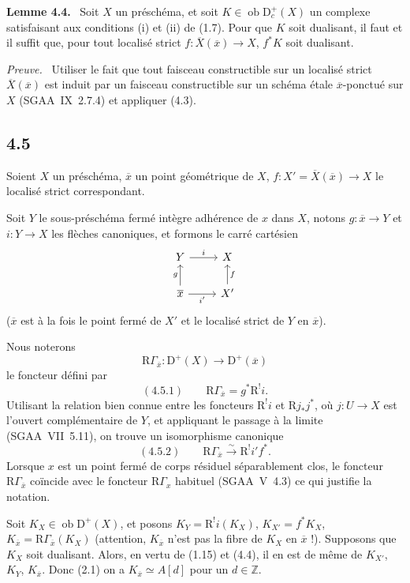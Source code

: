 \documentclass[11pt]{article}
\newenvironment{statement}[1]{\par\medskip\noindent\textbf{#1.}\ }{\par\medskip}
\newenvironment{prooftext}[1][Proof]{\par\noindent\emph{#1.}\ }{\par\medskip}
\newcommand{\R}{\mathrm{R}}\newcommand{\RHomCore}{\mathrm{RHom}}
\newcommand{\D}{\mathrm{D}}
\newcommand{\Z}{\mathbb{Z}}
\newcommand{\ob}{\operatorname{ob}}
\newcommand{\ol}[1]{\overline{#1}}
\providecommand{\ob}{\operatorname{ob}}
\providecommand{\R}{\mathrm R}
\providecommand{\Z}{\mathbb Z}
\begin{document}
\begin{statement}{Lemme 4.4}
Soit $X$ un préschéma, et soit $K\in\ob\D_c^+(X)$ un complexe satisfaisant aux conditions (i) et (ii) de (1.7). Pour que $K$ soit dualisant, il faut et il suffit que, pour tout localisé strict $f:\ol{X}(\ol{x})\to X$, $f^*K$ soit dualisant.
\end{statement}

\begin{prooftext}[Preuve]
Utiliser le fait que tout faisceau constructible sur un localisé strict $\ol{X}(\ol{x})$ est induit par un faisceau constructible sur un schéma étale $\ol{x}$-ponctué sur $X$ (SGAA~IX~2.7.4) et appliquer (4.3).
\end{prooftext}

\subsection*{4.5}
Soient $X$ un préschéma, $\ol{x}$ un point géométrique de $X$, $f:X'=\ol{X}(\ol{x})\to X$ le localisé strict correspondant.

Soit $Y$ le sous-préschéma fermé intègre adhérence de $x$ dans $X$, notons $g:\ol{x}\to Y$ et $i:Y\to X$ les flèches canoniques, et formons le carré cartésien
\[
\begin{tikzcd}
Y \arrow[r,"i"] & X \\
\ol{x} \arrow[u,"g"] \arrow[r,"i'"'] & X' \arrow[u,"f"']
\end{tikzcd}
\]
($\ol{x}$ est à la fois le point fermé de $X'$ et le localisé strict de $Y$ en $\ol{x}$).

Nous noterons
\[
\R\Gamma_{\ol{x}}:\D^+(X)\longrightarrow \D^+(\ol{x})
\]
le foncteur défini par
\[
(4.5.1)\qquad \R\Gamma_{\ol{x}}=g^*\R^{!}i.
\]
Utilisant la relation bien connue entre les foncteurs $\R^{!}i$ et $\R j_*j^*$, où $j:U\to X$ est l'ouvert complémentaire de $Y$, et appliquant le passage à la limite (SGAA~VII~5.11), on trouve un isomorphisme canonique
\[
(4.5.2)\qquad \R\Gamma_{\ol{x}}\xrightarrow{\sim}\R^{!}i' f^*.
\]
Lorsque $x$ est un point fermé de corps résiduel séparablement clos, le foncteur $\R\Gamma_{\ol{x}}$ coïncide avec le foncteur $\R\Gamma_x$ habituel (SGAA~V~4.3) ce qui justifie la notation.

Soit $K_X\in\ob\D^+(X)$, et posons $K_Y=\R^{!}i(K_X)$, $K_{X'}=f^*K_X$, $K_{\ol{x}}=\R\Gamma_{\ol{x}}(K_X)$ (attention, $K_{\ol{x}}$ n'est pas la fibre de $K_X$ en $\ol{x}$ !). Supposons que $K_X$ soit dualisant. Alors, en vertu de (1.15) et (4.4), il en est de même de $K_{X'}$, $K_Y$, $K_{\ol{x}}$. Donc (2.1) on a $K_{\ol{x}}\simeq A[d]$ pour un $d\in\Z$.
\end{document}
